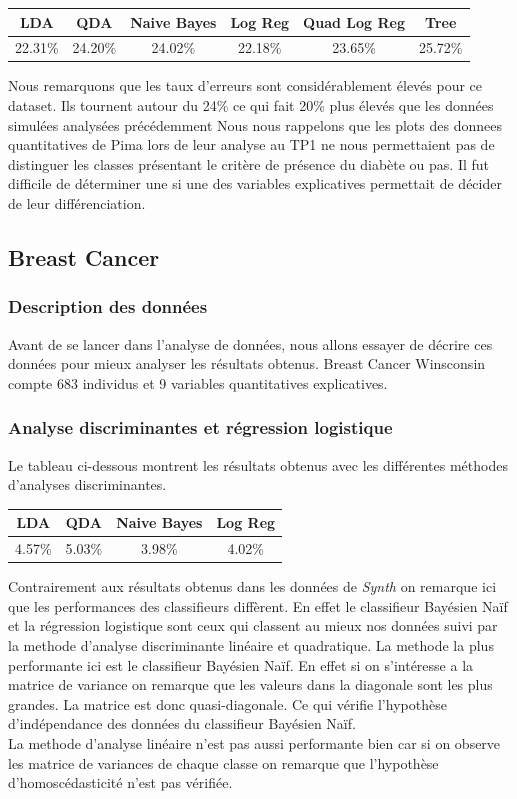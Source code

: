 \documentclass[10pt]{article}
\begin{document}
\begin{center}
	\begin{tabular}{|c | c | c| c| c| c|}
		\hline
		LDA & QDA & Naive Bayes & Log Reg & Quad Log Reg & Tree\\
		\hline	
		22.31\% & 24.20\% & 24.02\% & 22.18\% & 23.65\% & 25.72\%
	\end{tabular}
\end{center}

Nous remarquons que les taux d'erreurs sont considérablement élevés pour ce dataset. Ils tournent autour du 24\% ce qui fait 20\% plus élevés que les données simulées analysées précédemment Nous nous rappelons que les plots des donnees quantitatives de Pima lors de leur analyse au TP1 ne nous permettaient pas de distinguer les classes présentant le critère de présence du diabète ou pas. Il fut difficile de déterminer une si une des variables explicatives permettait de décider de leur différenciation. 

\subsection{Breast Cancer}
\subsubsection{Description des données}
Avant de se lancer dans l'analyse de données, nous allons essayer de décrire ces données pour mieux analyser les résultats obtenus. Breast Cancer Winsconsin compte 683 individus et 9 variables quantitatives explicatives.
\subsubsection{Analyse discriminantes et régression logistique}
Le tableau ci-dessous montrent les résultats obtenus avec les différentes méthodes d'analyses discriminantes.
\begin{center}
	\begin{tabular}{|c | c | c| c| }
		\hline
	LDA & QDA & Naive Bayes & Log Reg \\
	\hline	
	4.57\% & 5.03\% & 3.98\% & 4.02\%
	\end{tabular}
\end{center}

Contrairement aux résultats obtenus dans les données de \textit{Synth} on remarque ici que les performances des classifieurs diffèrent. En effet le classifieur Bayésien Naïf et la régression logistique sont ceux qui classent au mieux nos données suivi par la methode d'analyse discriminante linéaire et quadratique. 
La methode la plus performante ici est le  classifieur Bayésien Naïf. En effet si on s'intéresse a la matrice de variance  on remarque que les valeurs dans la diagonale sont les plus grandes. La matrice est donc quasi-diagonale. Ce qui vérifie l'hypothèse d'indépendance des données du classifieur Bayésien Naïf. \\
La methode d'analyse linéaire n'est pas aussi performante bien car si on observe les matrice de variances de chaque classe on remarque que l'hypothèse d'homoscédasticité n'est pas vérifiée.
\end{document}
